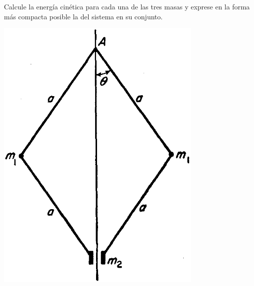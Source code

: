 \documentclass[11pt, a4paper, twoside]{article}
\begin{document}
\begin{enumerate}
\begin{minipage}[t][4.5cm]{0.65\textwidth}
			Calcule la energía cinética para cada una de las tres masas y exprese en la forma más compacta posible la del sistema en su conjunto.
	\end{minipage}
	\begin{minipage}[c][1cm][t]{0.35\textwidth}
		\includegraphics[width=0.75\textwidth]{figures/landauS52_fig4.png}
	\end{minipage}



\end{enumerate}
\end{document}
